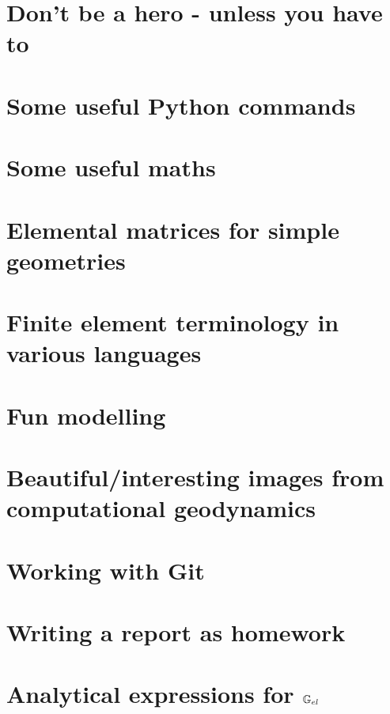 \documentclass[a4paper,12pt]{report}
\begin{document}
\chapter{Don't be a hero - unless you have to}  %
\chapter{Some useful Python commands}  %
\chapter{Some useful maths}  \label{app_maths} %
\chapter{Elemental matrices for simple geometries}\label{app:mm}  %
\chapter{Finite element terminology in various languages}  %
\chapter{Fun modelling}  %
\chapter{Beautiful/interesting images from computational geodynamics} %
\chapter{Working with Git}  %
\chapter{Writing a report as homework \label{app:grading}}  %
\chapter{Analytical expressions for ${\mathbb{G}}_{el}$} \label{app:Gel}  %
\end{document}
